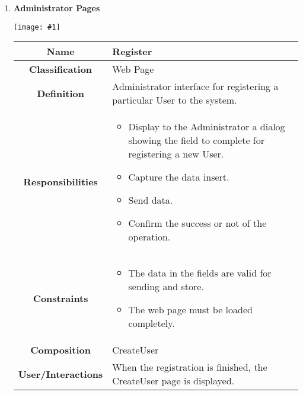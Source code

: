 \documentclass[11pt, a4paper,titlepage]{article}
\newcommand{\image}[1]{
	\begin{center}
		\noindent \texttt{[image: \#1]}
	\end{center}
	}
\begin{document}
\begin{enumerate}
\newpage
\item \textbf{Administrator Pages}\\
\image{page_administrator.png}
\begin{tabularx}{\textwidth}{| c | X |}
	\hline
	\textbf{Name} & 
	Register
	\\
	\hline
	\textbf{Classification} & 
	Web Page
	\\
	\hline
	\textbf{Definition} & 
	Administrator interface for registering a particular User to the system.\\
	\hline
	\textbf{Responsibilities} &
	\begin{itemize}
		\item Display to the Administrator a dialog showing the field to complete for registering a new User.
		\item  Capture the data insert.
		\item Send data.
		\item Confirm the success or not of the operation.
	\end{itemize}
	\\
	\hline
	\textbf{Constraints} & 
	\begin{itemize}
		\item  The data in the fields are valid for sending and store.
		\item The web page must be loaded completely.
	\end{itemize}
	\\
	\hline
	\textbf{Composition} & 
	CreateUser
	\\
	\hline
	\textbf{User/Interactions} & 
	When the registration is finished, the CreateUser page is displayed.
	\\
	\hline	
\end{tabularx}


\end{enumerate}
\end{document}
